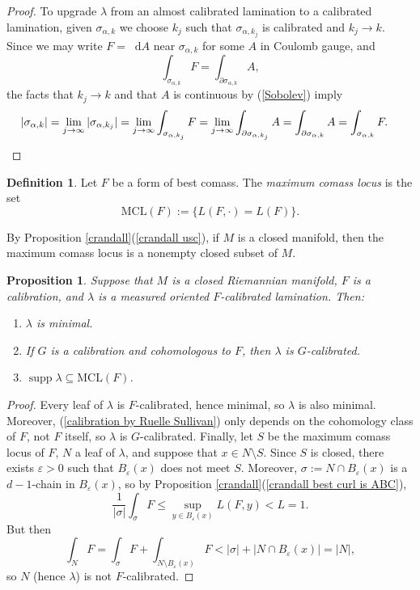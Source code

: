 \documentclass[reqno,11pt]{amsart}
\newcommand*\dif{\mathop{}\!\mathrm{d}}
\DeclareMathOperator{\supp}{supp}
\newcommand{\MCL}{\mathrm{MCL}}
\newcommand{\dfn}[1]{\emph{#1}\index{#1}}
\newtheorem{proposition}[theorem]{Proposition}
\theoremstyle{definition}
\newtheorem{definition}[theorem]{Definition}
\numberwithin{equation}{section}
\begin{document}
\begin{proof}
To upgrade $\lambda$ from an almost calibrated lamination to a calibrated lamination, given $\sigma_{\alpha, k}$ we choose $k_j$ such that $\sigma_{\alpha, k_j}$ is calibrated and $k_j \to k$.
Since we may write $F = \dif A$ near $\sigma_{\alpha, k}$ for some $A$ in Coulomb gauge, and 
$$\int_{\sigma_{\alpha, k}} F = \int_{\partial \sigma_{\alpha, k}} A,$$
the facts that $k_j \to k$ and that $A$ is continuous by (\ref{Sobolev}) imply 
\begin{align*}
|\sigma_{\alpha, k}| &= \lim_{j \to \infty} |\sigma_{\alpha, k_j}| = \lim_{j \to \infty} \int_{\sigma_{\alpha, k_j}} F = \lim_{j \to \infty} \int_{\partial \sigma_{\alpha, k_j}} A = \int_{\partial \sigma_{\alpha, k}} A = \int_{\sigma_{\alpha, k}} F. \qedhere 
\end{align*}
\end{proof}

\begin{definition}
Let $F$ be a form of best comass.
The \dfn{maximum comass locus} is the set
$$\MCL(F) := \{L(F, \cdot) = L(F)\}.$$
\end{definition}

By Proposition \ref{crandall}(\ref{crandall usc}), if $M$ is a closed manifold, then the maximum comass locus is a nonempty closed subset of $M$.

\begin{proposition}\label{properties of calibrated laminations}
Suppose that $M$ is a closed Riemannian manifold, $F$ is a calibration, and $\lambda$ is a measured oriented $F$-calibrated lamination.
Then:
\begin{enumerate}
\item $\lambda$ is minimal.
\item If $G$ is a calibration and cohomologous to $F$, then $\lambda$ is $G$-calibrated.
\item $\supp \lambda \subseteq \MCL(F)$.
\end{enumerate}
\end{proposition}
\begin{proof}
Every leaf of $\lambda$ is $F$-calibrated, hence minimal, so $\lambda$ is also minimal.
Moreover, (\ref{calibration by Ruelle Sullivan}) only depends on the cohomology class of $F$, not $F$ itself, so $\lambda$ is $G$-calibrated.
Finally, let $S$ be the maximum comass locus of $F$, $N$ a leaf of $\lambda$, and suppose that $x \in N \setminus S$.
Since $S$ is closed, there exists $\varepsilon > 0$ such that $B_\varepsilon(x)$ does not meet $S$.
Moreover, $\sigma := N \cap B_\varepsilon(x)$ is a $d-1$-chain in $B_\varepsilon(x)$, so by Proposition \ref{crandall}(\ref{crandall best curl is ABC}),
$$\frac{1}{|\sigma|} \int_\sigma F \leq \sup_{y \in B_\varepsilon(x)} L(F, y) < L = 1.$$
But then 
$$\int_N F = \int_\sigma F + \int_{N \setminus B_\varepsilon(x)} F < |\sigma| + |N \cap B_\varepsilon(x)| = |N|,$$
so $N$ (hence $\lambda$) is not $F$-calibrated.
\end{proof}
\end{document}
